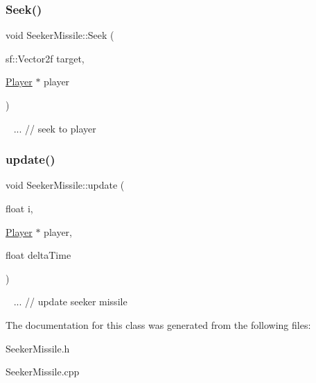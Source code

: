 \subsubsection{\texorpdfstring{Seek()}{Seek()}}
{\footnotesize\ttfamily void Seeker\+Missile\+::\+Seek (\begin{DoxyParamCaption}\item[{sf\+::\+Vector2f}]{target,  }\item[{\mbox{\hyperlink{class_player}{Player}} $\ast$}]{player }\end{DoxyParamCaption})}

~\newline
... // seek to player\mbox{\label{class_seeker_missile_af3baaea8b9680a9acb037a1596d9403b}} 
\subsubsection{\texorpdfstring{update()}{update()}}
{\footnotesize\ttfamily void Seeker\+Missile\+::update (\begin{DoxyParamCaption}\item[{float}]{i,  }\item[{\mbox{\hyperlink{class_player}{Player}} $\ast$}]{player,  }\item[{float}]{delta\+Time }\end{DoxyParamCaption})}

~\newline
... // update seeker missile

The documentation for this class was generated from the following files\+:\begin{DoxyCompactItemize}
\item 
Seeker\+Missile.\+h\item 
Seeker\+Missile.\+cpp\end{DoxyCompactItemize}
